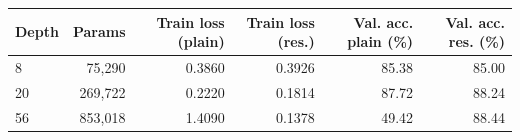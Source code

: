 \begin{tabular}{lrrrrr}
\toprule
Depth & Params & Train loss (plain) & Train loss (res.) & Val. acc. plain (\%) & Val. acc. res. (\%) \\
\midrule
8 & 75,290 & 0.3860 & 0.3926 & 85.38 & 85.00 \\
20 & 269,722 & 0.2220 & 0.1814 & 87.72 & 88.24 \\
56 & 853,018 & 1.4090 & 0.1378 & 49.42 & 88.44 \\
\bottomrule
\end{tabular}
